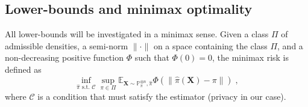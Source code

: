 \documentclass[10pt]{article} %
\newcommand{\Prob}[0]{\mathbb{P}}
\newcommand{\E}[0]{\mathbb{E}}
\newcommand\vect[1]{\mathbf{#1}}
\begin{document}
\subsection{Lower-bounds and minimax optimality}

All lower-bounds will be investigated in a minimax sense. Given a class $\Pi$ of admissible densities, a semi-norm $\| \cdot \|$ on a space containing the class $\Pi$, and a non-decreasing positive function $\Phi$ such that $\Phi(0) = 0$, the minimax risk is defined as
\begin{equation*}
    \inf_{\hat{\pi} \text{ s.t. } \mathcal{C}} \sup_{\pi \in \Pi}  \E_{\vect{X} \sim \Prob_{\pi}^{\otimes n}, \hat{\pi}} \Phi(\|\hat{\pi}(\vect{X}) - \pi \|) \;,
\end{equation*}
where $\mathcal{C}$ is a condition that must satisfy the estimator (privacy in our case).
\end{document}
